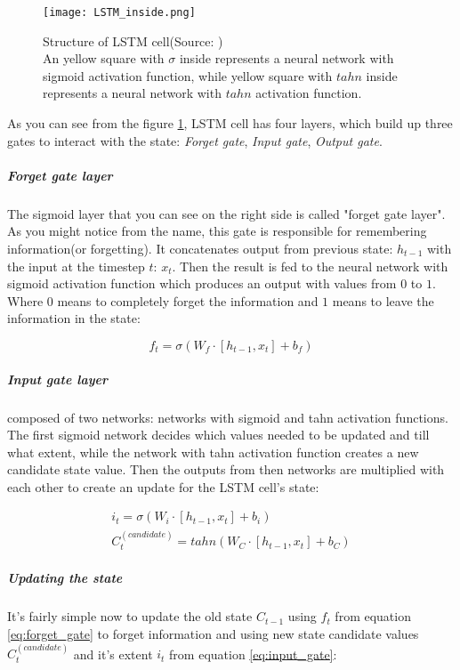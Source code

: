 \begin{figure}[H]
	\texttt{[image: LSTM\_inside.png]}
	\caption{
		Structure of LSTM cell(Source: \cite{ColahChristopher2015}) \\
		An yellow square with $\sigma$ inside represents a neural
		network with sigmoid activation function, while yellow square with $tahn$ inside represents
		a neural network with $tahn$ activation function.}

	\label{img:lstm} %
\end{figure}


As you can see from the figure \ref{img:lstm}, LSTM cell has four layers,
which build up three gates to interact with the state:
\emph{Forget gate}, \emph{Input gate}, \emph{Output gate}.


\subparagraph{Forget gate layer}
The sigmoid layer that you can see on the right side is
called "forget gate layer". As you might notice from the name, this gate is responsible
for remembering information(or forgetting). It concatenates output from previous state: $h_{t-1}$
with the input at the timestep $t$: $x_t$. Then the result is fed to the neural network
with sigmoid activation function which produces an output with values from $0$ to $1$.
Where 0 means to completely forget the information and $1$ means to leave
the information in the state:

\begin{equation} \label{eq:forget_gate}
	f_t = \sigma (W_f \cdot [h_{t-1}, x_t] + b_f)
\end{equation}

\subparagraph{Input gate layer} composed of two networks: networks with sigmoid
and tahn activation functions. The first sigmoid network decides which values needed
to be updated and till what extent, while the network with tahn activation function creates a
new candidate state value. Then the outputs from then networks are multiplied with each other
to create an update for the LSTM cell's state:

\begin{align} \label{eq:input_gate}
	i_t = \sigma (W_i \cdot [h_{t-1}, x_t] + b_i) \nonumber\\
	C_t^{(candidate)} = tahn(W_C \cdot [h_{t-1}, x_t] + b_C)
\end{align}

\subparagraph{Updating the state}
It's fairly simple now to update the old state $C_{t-1}$ using $f_t$ from equation
\ref{eq:forget_gate} to forget information and using new state candidate values
$C_t^{(candidate)}$ and it's extent $i_t$ from equation \ref{eq:input_gate}:

